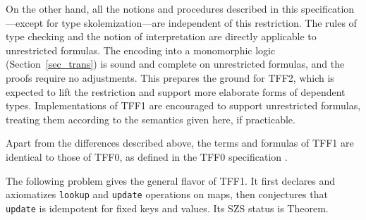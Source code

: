 On the other hand, all the notions and procedures described in this
specification---except for type skolemization---are independent of this
restriction. The rules of type checking and the notion of interpretation are
directly applicable to unrestricted formulas. The encoding into a monomorphic
logic (Section~\ref{sec_trans}) is sound and complete on unrestricted formulas,
and the proofs require
no adjustments. This prepares the ground for TFF2, which is expected to lift the
restriction and support more elaborate forms of dependent types. Implementations
of TFF1 are encouraged to support unrestricted formulas, treating them according
to the semantics given here, if practicable.

 Apart from the differences described above,
the terms and formulas of TFF1 are identical to those of TFF0, as defined in the
TFF0 specification \cite{sutcliffe-et-al-2012-tff0}.

 The following problem gives the general flavor of TFF1.
It first declares and axiomatizes {\tt lookup} and {\tt update} operations on
maps, then conjectures that {\tt update} is idempotent for fixed keys and
values. Its SZS status \cite{sutcliffe-2008-szs} is Theorem.

